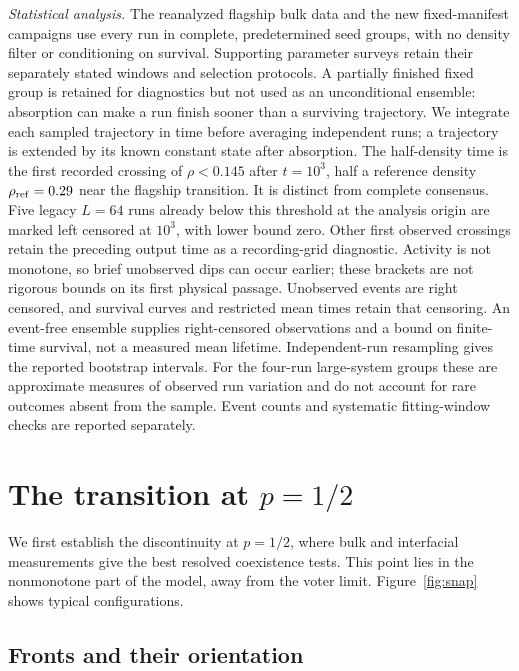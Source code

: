 \documentclass[pre,twocolumn,superscriptaddress,showpacs,floatfix]{revtex4-2}
\begin{document}
\textit{Statistical analysis.} The reanalyzed flagship bulk data and the new
fixed-manifest campaigns use every run in complete, predetermined seed groups,
with no density filter or conditioning on survival. Supporting parameter surveys
retain their separately stated windows and selection protocols.
A partially finished fixed group is retained for diagnostics but not
used as an unconditional ensemble: absorption can make a run finish sooner
than a surviving trajectory. We integrate each sampled
trajectory in time before averaging independent runs; a trajectory is extended
by its known constant state after absorption. The half-density time is the first
recorded crossing of $\rho<0.145$ after $t=10^3$, half a reference density
$\rho_{\rm ref}=0.29$ near the flagship transition. It is distinct from complete
consensus. Five legacy $L=64$ runs already below this threshold at the analysis
origin are marked left censored at $10^3$, with lower bound zero. Other
first observed crossings retain the preceding output time as a recording-grid
diagnostic. Activity is not monotone, so brief unobserved dips can occur earlier;
these brackets are not rigorous bounds on its first physical passage.
Unobserved events are right censored, and survival curves and restricted mean times retain
that censoring. An event-free ensemble supplies right-censored observations
and a bound on finite-time survival, not a measured mean lifetime.
Independent-run resampling gives the reported bootstrap
intervals. For the four-run large-system groups these are approximate measures
of observed run variation and do not account for rare outcomes absent from
the sample. Event counts and systematic fitting-window checks are reported
separately.

\section{The transition at $p = 1/2$}
\label{sec:flagship}

We first establish the discontinuity at $p = 1/2$, where bulk and interfacial
measurements give the best resolved coexistence tests. This point lies in the
nonmonotone part of the model, away from the voter limit. Figure~\ref{fig:snap} shows typical configurations.

\subsection{Fronts and their orientation}
\label{sec:fronts}
\end{document}
